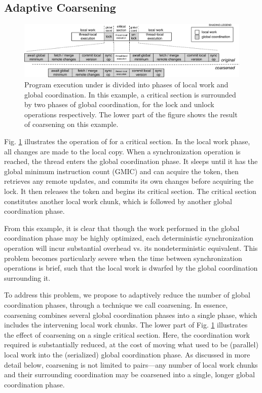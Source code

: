 \subsection{Adaptive Coarsening}

\begin{figure}[t]
\centering
\includegraphics[width=6.8in]{figures/coarsening}
\caption{Program execution under \lib{} is divided into phases of local work and global coordination. In this example, a critical section is surrounded by two phases of global coordination, for the lock and unlock operations respectively. The lower part of the figure shows the result of coarsening on this example.}
\label{f:coarsening}
\end{figure}

Fig. \ref{f:coarsening} illustrates the operation of \lib{} for a critical section. In the local work phase, all changes are made to the local copy. When a synchronization operation is reached, the thread enters the global coordination phase. It sleeps until it has the global minimum instruction count (GMIC) and can acquire the token, then retrieves any remote updates, and commits its own changes before acquiring the lock. It then releases the token and begins its critical section. The critical section constitutes another local work chunk, which is followed by another global coordination phase. 

From this example, it is clear that though the work performed in the global coordination phase may be highly optimized, each deterministic synchronization operation will incur substantial overhead vs. its nondeterministic equivalent. This problem becomes particularly severe when the time between synchronization operations is brief, such that the local work is dwarfed by the global coordination surrounding it. 

To address this problem, we propose to adaptively reduce the number of global coordination phases, through a technique we call coarsening. In essence, coarsening combines several global coordination phases into a single phase, which includes the intervening local work chunks. The lower part of Fig. \ref{f:coarsening} illustrates the effect of coarsening on a single critical section. Here, the coordination work required is substantially reduced, at the cost of moving what used to be (parallel) local work into the (serialized) global coordination phase. 
As discussed in more detail below, coarsening is not limited to pairs---any number of local work chunks and their surrounding coordination may be coarsened into a single, longer global coordination phase. 

